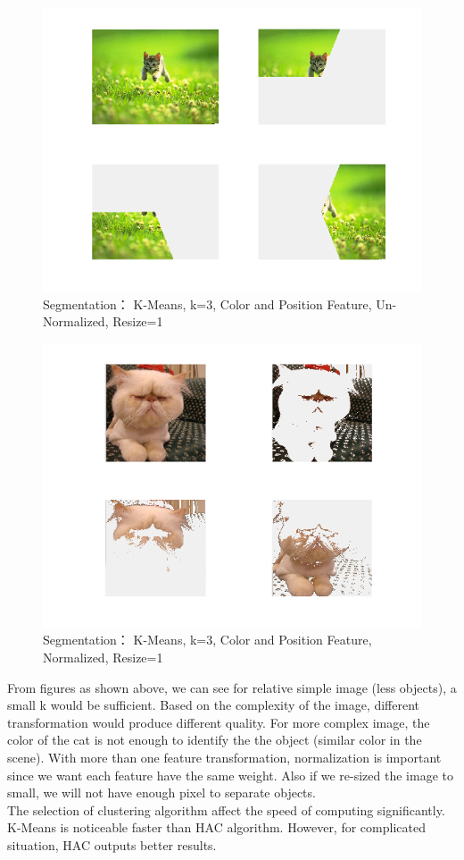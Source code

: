 \documentclass[12pt]{article}
\begin{document}
\begin{figure}[h!]
	\centering
    \includegraphics[scale=0.45]{seg_3_kmeans_color_position_true_1_us}
    \caption{Segmentation： K-Means, k=3, Color and Position Feature, Un-Normalized, Resize=1}
\end{figure}

\begin{figure}[h!]
	\centering
    \includegraphics[scale=0.45]{seg_3_kmeans_color_position_true_1_us_2}
    \caption{Segmentation： K-Means, k=3, Color and Position Feature, Normalized, Resize=1}
\end{figure}
\vskip 10cm
\noindent
From figures as shown above, we can see for relative simple image (less objects), a small k would be sufficient. Based on the complexity of the image, different transformation would produce different quality. For more complex image, the color of the cat is not enough to identify the the object (similar color in the scene). With more than one feature transformation, normalization is important since we want each feature have the same weight. Also if we re-sized the image to small, we will not have enough pixel to separate objects.
\\
The selection of clustering algorithm affect the speed of computing significantly. K-Means is noticeable faster than HAC algorithm. However, for complicated situation, HAC outputs better results.
\end{document}
